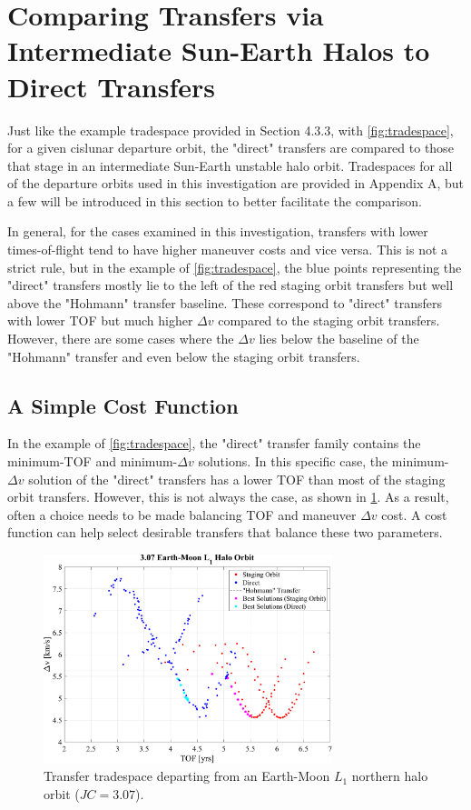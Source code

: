 \section{Comparing Transfers via Intermediate Sun-Earth Halos to Direct Transfers}
Just like the example tradespace provided in Section 4.3.3, with \cref{fig:tradespace}, for a given
cislunar departure orbit, the "direct" transfers are compared to those that stage in an
intermediate Sun-Earth unstable halo orbit. Tradespaces for all of the departure orbits used in
this investigation are provided in Appendix A, but a few will be introduced in this section to
better facilitate the comparison.

In general, for the cases examined in this investigation, transfers with lower times-of-flight tend
to have higher maneuver costs and vice versa. This is not a strict rule, but in the example of
\cref{fig:tradespace}, the blue points representing the "direct" transfers mostly lie to the left
of the red staging orbit transfers but well above the "Hohmann" transfer baseline. These correspond
to "direct" transfers with lower TOF but much higher $\Delta v$ compared to the staging orbit
transfers. However, there are some cases where the $\Delta v$ lies below the baseline of the
"Hohmann" transfer and even below the staging orbit transfers.

\subsection{A Simple Cost Function}
In the example of \cref{fig:tradespace}, the "direct" transfer family contains the minimum-TOF and
minimum-$\Delta v$ solutions. In this specific case, the minimum-$\Delta v$ solution of the
"direct" transfers has a lower TOF than most of the staging orbit transfers. However, this is not
always the case, as shown in \cref{fig:lowDeltav}. As a result, often a choice needs to be made
balancing TOF and maneuver $\Delta v$ cost. A cost function can help select desirable transfers
that balance these two parameters.

\begin{figure}[ht]
    \centering
    \includegraphics[width=0.75\textwidth]{figures/TradeSpace_L1Halo_3_07.pdf}
    \caption{Transfer tradespace departing from an Earth-Moon $L_{1}$ northern halo orbit ($JC=3.07$).}
    \label{fig:lowDeltav}
\end{figure}

